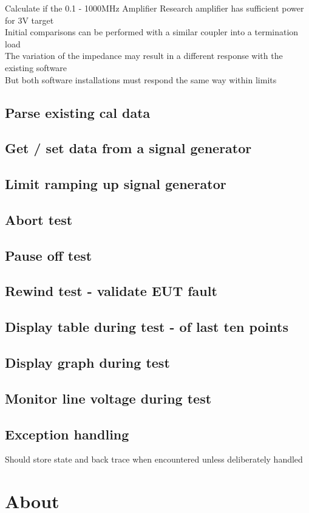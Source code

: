 Calculate if the 0.1 - 1000MHz Amplifier Research amplifier has sufficient power for 3V target\\
Initial comparisons can be performed with a similar coupler into a termination load\\
The variation of the impedance may result in a different response with the existing software\\
But both software installations must respond the same way within limits\\


\subsection{Parse existing cal data}
\subsection{Get / set data from a signal generator}
\subsection{Limit ramping up signal generator}
\subsection{Abort test}
\subsection{Pause off test}
\subsection{Rewind test - validate EUT fault}
\subsection{Display table during test - of last ten points}
\subsection{Display graph during test}
\subsection{Monitor line voltage during test}
\subsection{Exception handling}
Should store state and back trace when encountered unless deliberately handled\\

\newpage\section{About}
